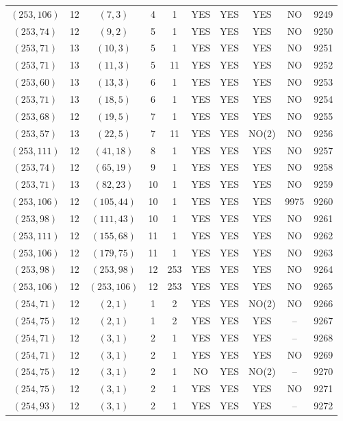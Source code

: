\begin{longtable}{|c|c|c|c|c|c|c|c|c|c|}
$(253, 106)$ & 12 & $(7, 3)$ & 4 & 1 & YES & YES & YES & NO & 9249\\
$(253, 74)$ & 12 & $(9, 2)$ & 5 & 1 & YES & YES & YES & NO & 9250\\
$(253, 71)$ & 13 & $(10, 3)$ & 5 & 1 & YES & YES & YES & NO & 9251\\
$(253, 71)$ & 13 & $(11, 3)$ & 5 & 11 & YES & YES & YES & NO & 9252\\
$(253, 60)$ & 13 & $(13, 3)$ & 6 & 1 & YES & YES & YES & NO & 9253\\
$(253, 71)$ & 13 & $(18, 5)$ & 6 & 1 & YES & YES & YES & NO & 9254\\
$(253, 68)$ & 12 & $(19, 5)$ & 7 & 1 & YES & YES & YES & NO & 9255\\
$(253, 57)$ & 13 & $(22, 5)$ & 7 & 11 & YES & YES & NO(2) & NO & 9256\\
$(253, 111)$ & 12 & $(41, 18)$ & 8 & 1 & YES & YES & YES & NO & 9257\\
$(253, 74)$ & 12 & $(65, 19)$ & 9 & 1 & YES & YES & YES & NO & 9258\\
$(253, 71)$ & 13 & $(82, 23)$ & 10 & 1 & YES & YES & YES & NO & 9259\\
$(253, 106)$ & 12 & $(105, 44)$ & 10 & 1 & YES & YES & YES & 9975 & 9260\\
$(253, 98)$ & 12 & $(111, 43)$ & 10 & 1 & YES & YES & YES & NO & 9261\\
$(253, 111)$ & 12 & $(155, 68)$ & 11 & 1 & YES & YES & YES & NO & 9262\\
$(253, 106)$ & 12 & $(179, 75)$ & 11 & 1 & YES & YES & YES & NO & 9263\\
$(253, 98)$ & 12 & $(253, 98)$ & 12 & 253 & YES & YES & YES & NO & 9264\\
$(253, 106)$ & 12 & $(253, 106)$ & 12 & 253 & YES & YES & YES & NO & 9265\\
$(254, 71)$ & 12 & $(2, 1)$ & 1 & 2 & YES & YES & NO(2) & NO & 9266\\
$(254, 75)$ & 12 & $(2, 1)$ & 1 & 2 & YES & YES & YES & -- & 9267\\
$(254, 71)$ & 12 & $(3, 1)$ & 2 & 1 & YES & YES & YES & -- & 9268\\
$(254, 71)$ & 12 & $(3, 1)$ & 2 & 1 & YES & YES & YES & NO & 9269\\
$(254, 75)$ & 12 & $(3, 1)$ & 2 & 1 & NO & YES & NO(2) & -- & 9270\\
$(254, 75)$ & 12 & $(3, 1)$ & 2 & 1 & YES & YES & YES & NO & 9271\\
$(254, 93)$ & 12 & $(3, 1)$ & 2 & 1 & YES & YES & YES & -- & 9272\\

\end{longtable}
